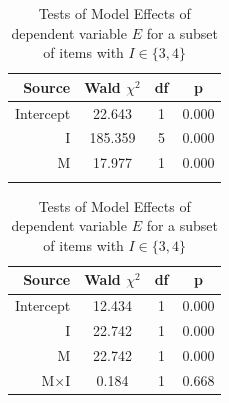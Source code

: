 \begin{table}
\center
\scriptsize
\begin{minipage}[b]{0.45\textwidth}\centering
	\begin{tabular}{rccc}
	\toprule[1.5pt]
	Source    & Wald $\chi^2$ & df & p \\
	\midrule
	Intercept & 22.643 & 1 & 0.000 \\
	I & 185.359	& 5 & 0.000 \\
	M & 17.977 & 1 & 0.000 \\
	& & & \\
	\bottomrule[1.5pt]
	\end{tabular}
	\caption{Tests of Model Effects of dependent variable $E$ }
    \label{tab:glm_logit}
\end{minipage}
\hfill
\begin{minipage}[b]{0.45\textwidth}
	\begin{tabular}{rccc}
	\toprule[1.5pt]
	Source    & Wald $\chi^2$ & df & p \\
	\midrule
	Intercept & 12.434 & 1 & 0.000 \\
	I & 22.742	& 1 & 0.000 \\
	M & 22.742 & 1 & 0.000 \\
	M$\times$I	& 0.184 & 1 & 0.668 \\
	\bottomrule[1.5pt]
	\end{tabular}
	\caption{Tests of Model Effects of dependent variable $E$ for a subset of items with $I \in \{3,4\}$}
    \label{tab:glm_logit_34}
\end{minipage}
\end{table}

